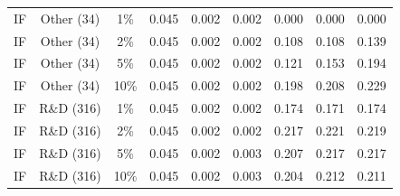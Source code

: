 \documentclass[10pt,onecolumn,letterpaper]{article}
\begin{document}
\begin{table}[!t]
{\begin{tabular}{lcccccccc}
IF & Other (34) & 1\% & 0.045 & 0.002 & 0.002 & 0.000 & 0.000 & 0.000 \\
IF & Other (34) & 2\% & 0.045 & 0.002 & 0.002 & 0.108 & 0.108 & 0.139 \\
IF & Other (34) & 5\% & 0.045 & 0.002 & 0.002 & 0.121 & 0.153 & 0.194 \\
IF & Other (34) & 10\% & 0.045 & 0.002 & 0.002 & 0.198 & 0.208 & 0.229 \\
IF & R\&D (316) & 1\% & 0.045 & 0.002 & 0.002 & 0.174 & 0.171 & 0.174 \\
IF & R\&D (316) & 2\% & 0.045 & 0.002 & 0.002 & 0.217 & 0.221 & 0.219 \\
IF & R\&D (316) & 5\% & 0.045 & 0.002 & 0.003 & 0.207 & 0.217 & 0.217 \\
IF & R\&D (316) & 10\% & 0.045 & 0.002 & 0.003 & 0.204 & 0.212 & 0.211 \\
\bottomrule
\end{tabular}}
\end{table}
\end{document}
